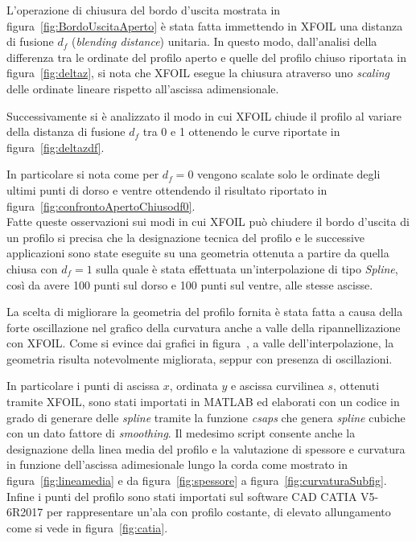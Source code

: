 L'operazione di chiusura del bordo d'uscita mostrata in figura~\vref{fig:BordoUscitaAperto} è stata fatta immettendo in XFOIL una distanza di fusione $d_f$ (\emph{blending distance}) unitaria. In questo modo, dall'analisi della differenza tra le ordinate del profilo aperto e quelle del profilo chiuso riportata in figura~\vref{fig:deltaz}, si nota che XFOIL esegue la chiusura atraverso uno \emph{scaling} delle ordinate lineare rispetto all'ascissa adimensionale.

Successivamente si è analizzato il modo in cui XFOIL chiude il profilo al variare della distanza di fusione $d_f$ tra 0 e 1 ottenendo le curve riportate in figura~\vref{fig:deltazdf}.

In particolare si nota come per $d_f=0$ vengono scalate solo le ordinate degli ultimi punti di dorso e ventre ottendendo il risultato riportato in figura~\vref{fig:confrontoApertoChiusodf0}.\\

Fatte queste osservazioni sui modi in cui XFOIL può chiudere il bordo d'uscita di un profilo si precisa che la designazione tecnica del profilo e le successive applicazioni sono state eseguite su una geometria ottenuta a partire da quella chiusa con $d_f=1$ sulla quale è stata effettuata un'interpolazione di tipo {\itshape Spline}, così da avere 100 punti sul dorso e 100 punti sul ventre, alle stesse ascisse. 
 
La scelta di migliorare la geometria del profilo fornita è stata fatta a causa della forte oscillazione nel grafico della curvatura anche a valle della ripannellizazione con XFOIL. Come si evince dai grafici in figura~, a valle dell'interpolazione, la geometria risulta notevolmente migliorata, seppur con presenza di oscillazioni. 

In particolare i punti di ascissa $x$, ordinata $y$ e ascissa curvilinea $s$, ottenuti tramite XFOIL, sono stati importati in MATLAB ed elaborati con un codice in grado di generare delle {\itshape spline} tramite la funzione {\itshape csaps} che genera {\itshape spline} cubiche con un dato fattore di {\itshape smoothing}. Il medesimo script consente anche la designazione della linea media del profilo e la valutazione di spessore e curvatura in funzione dell’ascissa adimesionale lungo la corda come mostrato in figura~\ref{fig:lineamedia} e da figura~\ref{fig:spessore} a figura~\ref{fig:curvaturaSubfig}.  \\

Infine i punti del profilo sono stati importati sul software CAD CATIA V5-6R2017 per rappresentare un'ala con profilo costante, di elevato allungamento come si vede in figura~\vref{fig:catia}.


